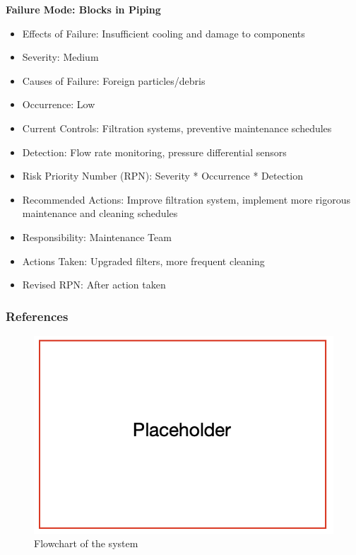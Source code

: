 \textbf{Failure Mode: Blocks in Piping}
\begin{itemize}
  \item Effects of Failure: Insufficient cooling and damage to components
  \item Severity: Medium
  \item Causes of Failure: Foreign particles/debris
  \item Occurrence: Low
  \item Current Controls: Filtration systems, preventive maintenance schedules
  \item Detection: Flow rate monitoring, pressure differential sensors
  \item Risk Priority Number (RPN): Severity * Occurrence * Detection
  \item Recommended Actions: Improve filtration system, implement more rigorous maintenance and cleaning schedules
  \item Responsibility: Maintenance Team
  \item Actions Taken: Upgraded filters, more frequent cleaning
  \item Revised RPN: After action taken
\end{itemize}
\subsubsection{References}

\begin{figure}[ht]
  \centering
  \includegraphics[width=\linewidth]{texfiles/mech/eimg/cooling/placeholder}
  \caption{Flowchart of the system}
  \label{fig:schematic}
\end{figure}




